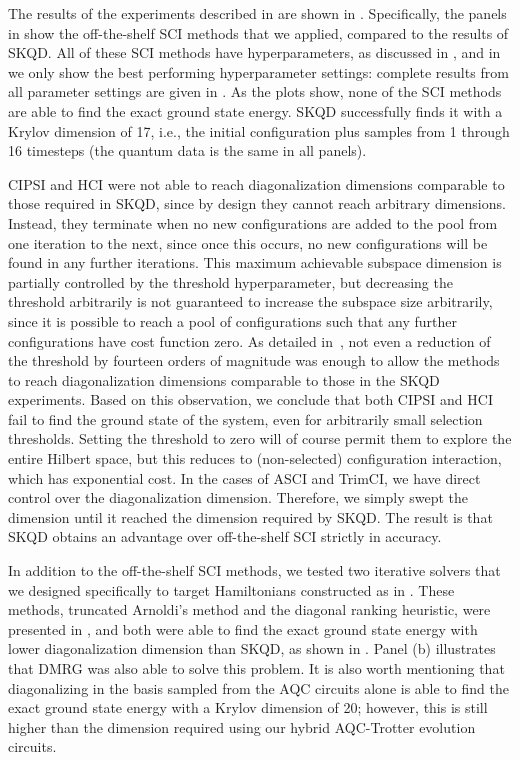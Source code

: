 \documentclass[
  reprint,            %
  amsmath,amssymb,
  aps,
  superscriptaddress, %
  longbibliography
]{revtex4-2}
\theoremstyle{definition}
\begin{document}
The results of the experiments described in  are shown in .
Specifically, the panels in  show the off-the-shelf SCI methods that we applied, compared to the results of SKQD.
All of these SCI methods have hyperparameters, as discussed in , and in  we only show the best performing hyperparameter settings: complete results from all parameter settings are given in .
As the plots show, none of the SCI methods are able to find the exact ground state energy.
SKQD successfully finds it with a Krylov dimension of 17, i.e., the initial configuration plus samples from 1 through 16 timesteps (the quantum data is the same in all panels).

CIPSI and HCI were not able to reach diagonalization dimensions comparable to those required in SKQD, since by design they cannot reach arbitrary dimensions.
Instead, they terminate when no new configurations are added to the pool from one iteration to the next, since once this occurs, no new configurations will be found in any further iterations.
This maximum achievable subspace dimension is partially controlled by the threshold hyperparameter, but decreasing the threshold arbitrarily is not guaranteed to increase the subspace size arbitrarily, since it is possible to reach a pool of configurations such that any further configurations have cost function zero.
As detailed in~, not even a reduction of the threshold by fourteen orders of magnitude was enough to allow the methods to reach diagonalization dimensions comparable to those in the SKQD experiments. Based on this observation, we conclude that both CIPSI and HCI fail to find the ground state of the system, even for arbitrarily small selection thresholds.
Setting the threshold to zero will of course permit them to explore the entire Hilbert space, but this reduces to (non-selected) configuration interaction, which has exponential cost.
In the cases of ASCI and TrimCI, we have direct control over the diagonalization dimension.
Therefore, we simply swept the dimension until it reached the dimension required by SKQD.
The result is that SKQD obtains an advantage over off-the-shelf SCI strictly in accuracy. 

In addition to the off-the-shelf SCI methods, we tested two iterative solvers that we designed specifically to target Hamiltonians constructed as in .
These methods, truncated Arnoldi's method and the diagonal ranking heuristic, were presented in , and both were able to find the exact ground state energy with lower diagonalization dimension than SKQD, as shown in .
Panel (b) illustrates that DMRG was also able to solve this problem.
It is also worth mentioning that diagonalizing in the basis sampled from the AQC circuits alone is able to find the exact ground state energy with a Krylov dimension of 20; however, this is still higher than the dimension required using our hybrid AQC-Trotter evolution circuits.
\end{document}
